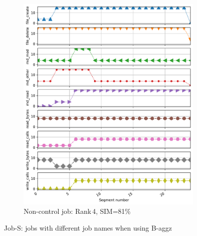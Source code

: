 \documentclass{jhps}
\begin{document}
\begin{figure}[bt]
\begin{subfigure}{0.3\textwidth}
\includegraphics[width=\textwidth]{job_similarities_4296426-out/bin_aggzeros-0.8077--4timeseries4483904}
\caption{Non-control job: Rank\,4, SIM=81\%}
\end{subfigure}

\caption{Job-S: jobs with different job names when using B-aggz}%
\label{fig:job-S-bin-agg}
\end{figure}
\end{document}
